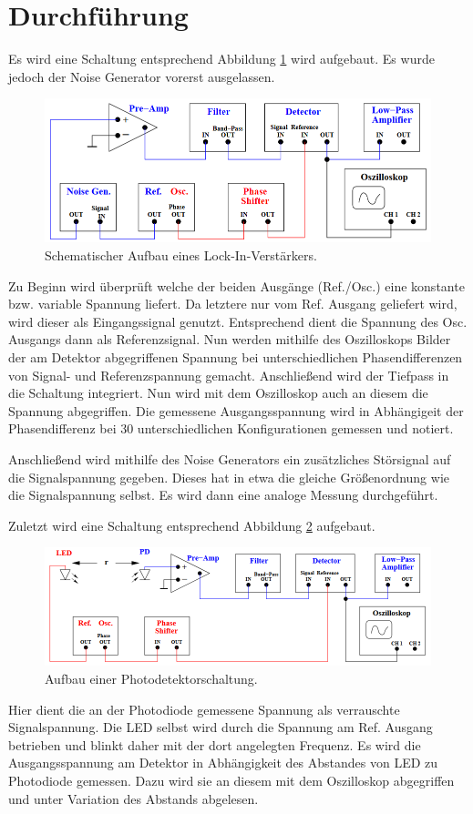 \section{Durchführung}
\label{sec:Durchführung}

Es wird eine Schaltung entsprechend Abbildung \ref{fig:Schaltung1} wird aufgebaut.
Es wurde jedoch der Noise Generator vorerst ausgelassen.
\begin{figure}[H]
  \centering
  \includegraphics[width=14cm]{Schaltung1.PNG}
  \caption{Schematischer Aufbau eines Lock-In-Verstärkers. \cite{sample}}
  \label{fig:Schaltung1}
\end{figure}

Zu Beginn wird überprüft welche der beiden Ausgänge (Ref./Osc.) eine konstante bzw.
variable Spannung liefert. Da letztere nur vom Ref. Ausgang geliefert wird, wird
dieser als Eingangssignal genutzt. Entsprechend dient die Spannung des Osc. Ausgangs
dann als Referenzsignal.
Nun werden mithilfe des Oszilloskops Bilder der am Detektor abgegriffenen Spannung
bei unterschiedlichen Phasendifferenzen von Signal- und Referenzspannung gemacht.
Anschließend wird der Tiefpass in die Schaltung integriert. Nun wird mit dem Oszilloskop
auch an diesem die Spannung abgegriffen. Die gemessene Ausgangsspannung wird in
Abhängigeit der Phasendifferenz bei 30 unterschiedlichen Konfigurationen gemessen und notiert.

Anschließend wird mithilfe des Noise Generators ein zusätzliches Störsignal auf die
Signalspannung gegeben. Dieses hat in etwa die gleiche Größenordnung wie die
Signalspannung selbst. Es wird dann eine analoge Messung durchgeführt.

Zuletzt wird eine Schaltung entsprechend Abbildung \ref{fig:Schaltung2} aufgebaut.
\begin{figure}[H]
  \centering
  \includegraphics[width=14cm]{Schaltung2.PNG}
  \caption{Aufbau einer Photodetektorschaltung. \cite{sample}}
  \label{fig:Schaltung2}
\end{figure}
Hier dient die an der Photodiode gemessene Spannung als verrauschte Signalspannung.
Die LED selbst wird durch die Spannung am Ref. Ausgang betrieben und blinkt daher
mit der dort angelegten Frequenz.
Es wird die Ausgangsspannung am Detektor in Abhängigkeit des Abstandes von LED zu Photodiode
gemessen. Dazu wird sie an diesem mit dem Oszilloskop abgegriffen und unter Variation des
Abstands abgelesen.
